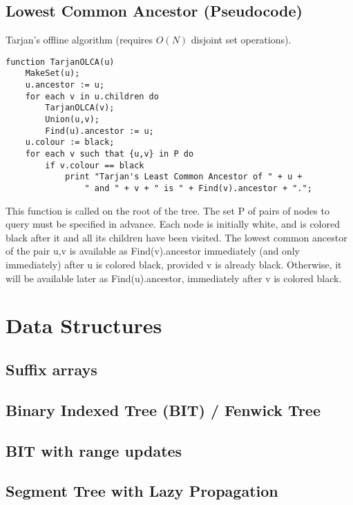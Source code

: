 \documentclass[10pt]{extarticle}
\begin{document}
\begin{multicols*}{3}
\subsection{Lowest Common Ancestor (Pseudocode)} %
Tarjan's offline algorithm (requires $O(N)$ disjoint set operations).
\begin{lstlisting}
function TarjanOLCA(u)
    MakeSet(u);
    u.ancestor := u;
    for each v in u.children do
        TarjanOLCA(v);
        Union(u,v);
        Find(u).ancestor := u;
    u.colour := black;
    for each v such that {u,v} in P do
        if v.colour == black
            print "Tarjan's Least Common Ancestor of " + u +
                " and " + v + " is " + Find(v).ancestor + ".";
\end{lstlisting}
This function is called on the root of the tree. The set P of pairs of nodes to
query must be specified in advance. Each node is initially white, and is
colored black after it and all its children have been visited. The lowest
common ancestor of the pair {u,v} is available as Find(v).ancestor immediately
(and only immediately) after u is colored black, provided v is already black.
Otherwise, it will be available later as Find(u).ancestor, immediately after v
is colored black.

\section{Data Structures}

\subsection{Suffix arrays} %


\subsection{Binary Indexed Tree (BIT) / Fenwick Tree} %


\subsection{BIT with range updates} %


\subsection{Segment Tree with Lazy Propagation} %



\end{multicols*}
\end{document}
